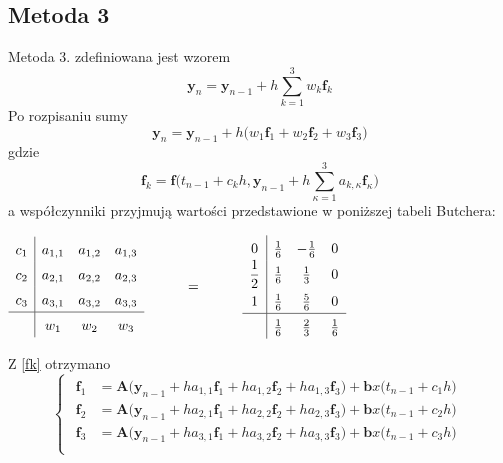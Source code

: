 \documentclass[a4paper, 12pt, twoside, openany]{article}
\newcommand{\y}{\mathbf{y}}
\newcommand{\A}{\mathbf{A}}
\newcommand{\f}{\mathbf{f}}
\renewcommand{\b}{\mathbf{b}}
\begin{document}
    \subsection{Metoda 3}
    Metoda 3. zdefiniowana jest wzorem
    \begin{equation}
        \label{m3}
        \y_n = \y_{n-1} + h\sum\limits_{k=1}^{3}w_k\mathbf{f}_k
    \end{equation}
    Po rozpisaniu sumy
    \begin{equation}
        \label{m3rozpisane}
        \y_n = \y_{n-1} + h\Big( w_1\f_1 + w_2\f_2 + w_3\f_3 \Big)
    \end{equation}
    gdzie
    \begin{equation}
        \label{fk}
        \mathbf{f}_k = \mathbf{f}\bigg(t_{n-1}+c_kh,\y_{n-1} + h\sum\limits_{\kappa=1}^{3}a_{k,\kappa}\mathbf{f}_\kappa\bigg)
    \end{equation}
    a współczynniki przyjmują wartości przedstawione w poniższej tabeli Butchera:
    \begin{center}
        $\arraycolsep=5pt\def\arraystretch{1.5}
        \begin{array}{c|ccc}
            c_1 & a_{1,1} & a_{1,2} & a_{1,3} \\
            c_2 & a_{2,1} & a_{2,2} & a_{2,3} \\
            c_3 & a_{3,1} & a_{3,2} & a_{3,3} \\
            \hline
            & w_1 & w_2 & w_3
        \end{array}
        \hspace{1cm} = \hspace{1cm}
        \begin{array}{c|ccc}
            0            & \frac{1}{6} & -\frac{1}{6} & 0 \\
            \dfrac{1}{2} & \frac{1}{6} & \frac{1}{3} & 0 \\
            1            & \frac{1}{6} & \frac{5}{6} & 0 \\
            \hline
            & \frac{1}{6} & \frac{2}{3} & \frac{1}{6}
        \end{array} $
    \end{center}
    Z \eqref{fk} otrzymano
    \begin{equation}
        \label{uklad1}
        \left\{\begin{array}{c}
            \begin{aligned}
                \f_1 &= \A\big(\y_{n-1} + ha_{1,1}\f_1 + ha_{1,2}\f_2 +   ha_{1,3}\f_3\big) + \b x\big(t_{n-1} + c_1h \big) \\
                \f_2 &= \A\big(\y_{n-1} + ha_{2,1}\f_1 + ha_{2,2}\f_2 +   ha_{2,3}\f_3\big) + \b x\big(t_{n-1} + c_2h \big) \\
                \f_3 &= \A\big(\y_{n-1} + ha_{3,1}\f_1 + ha_{3,2}\f_2 +   ha_{3,3}\f_3\big) + \b x\big(t_{n-1} + c_3h \big) \\
            \end{aligned}
        \end{array}\right.
    \end{equation}
\end{document}
